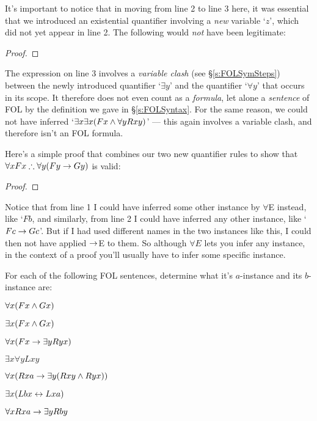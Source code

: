 It's important to notice that in moving from line 2 to line 3 here, it was essential that we introduced an existential quantifier involving a \emph{new} variable `$z$', which did not yet appear in line 2.  The following would \emph{not} have been legitimate:

\begin{proof}
	 
	 
\end{proof}
The expression on line 3 involves a \emph{variable clash} (see \S\ref{s:FOLSymSteps}) between the newly introduced quantifier `$\exists y$' and the quantifier `$\forall y$' that occurs in its scope.  It therefore does not even count as a \emph{formula}, let alone a \emph{sentence} of FOL by the definition we gave in \S\ref{s:FOLSyntax}.  For the same reason, we could not have inferred `$\exists x\exists x(Fx \wedge \forall y Rxy)$' --- this again involves a variable clash, and therefore isn't an FOL formula.

Here's a simple proof that combines our two new quantifier rules to show that $\forall xFx \therefore \forall y(Fy \rightarrow Gy)$ is valid:
\begin{proof}
	 
	 
\end{proof}
\noindent Notice that from line 1 I could have inferred some other instance by $\forall$E instead, like `$Fb$, and similarly, from line 2 I could have inferred any other instance, like `$Fc \rightarrow Gc$'. But if I had used different names in the two instances like this, I could then not have applied $\rightarrow$E to them.  So although $\forall E$ lets you infer any instance, in the context of a proof you'll usually have to infer some specific instance.

\practiceproblems

\problempart For each of the following FOL sentences, determine what it's $a$-instance and its $b$-instance are:


\begin{earg}

\item $\forall x(Fx \wedge Gx)$

\item $\exists x(Fx \wedge Gx)$

\item $\forall x(Fx \rightarrow \exists yRyx)$

\item $\exists x \forall y Lxy$

\item $\forall x(Rxa \rightarrow \exists y(Rxy \wedge Ryx))$

\item $\exists x(Lbx \leftrightarrow Lxa)$

\item $\forall xRxa \rightarrow \exists yRby$



\end{earg}

